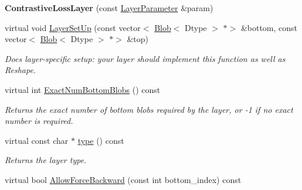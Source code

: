 \begin{DoxyCompactItemize}
{\bfseries Contrastive\+Loss\+Layer} (const \mbox{\hyperlink{classcaffe_1_1_layer_parameter}{Layer\+Parameter}} \&param)
\item 
virtual void \mbox{\hyperlink{classcaffe_1_1_contrastive_loss_layer_a957623c05cb2289cd2ae9e9e93b48969}{Layer\+Set\+Up}} (const vector$<$ \mbox{\hyperlink{classcaffe_1_1_blob}{Blob}}$<$ Dtype $>$ $\ast$$>$ \&bottom, const vector$<$ \mbox{\hyperlink{classcaffe_1_1_blob}{Blob}}$<$ Dtype $>$ $\ast$$>$ \&top)
\begin{DoxyCompactList}\small\item\em Does layer-\/specific setup\+: your layer should implement this function as well as Reshape. \end{DoxyCompactList}\item 
virtual int \mbox{\hyperlink{classcaffe_1_1_contrastive_loss_layer_aa6f3ad6918e64ffa1828e821accf25e9}{Exact\+Num\+Bottom\+Blobs}} () const
\begin{DoxyCompactList}\small\item\em Returns the exact number of bottom blobs required by the layer, or -\/1 if no exact number is required. \end{DoxyCompactList}\item 
\mbox{\label{classcaffe_1_1_contrastive_loss_layer_ab88839b44729c1bd11de97a44011aaa9}} 
virtual const char $\ast$ \mbox{\hyperlink{classcaffe_1_1_contrastive_loss_layer_ab88839b44729c1bd11de97a44011aaa9}{type}} () const
\begin{DoxyCompactList}\small\item\em Returns the layer type. \end{DoxyCompactList}\item 
virtual bool \mbox{\hyperlink{classcaffe_1_1_contrastive_loss_layer_af0f16d5119ac6118b670c1966c38fd7d}{Allow\+Force\+Backward}} (const int bottom\+\_\+index) const
\end{DoxyCompactItemize}

